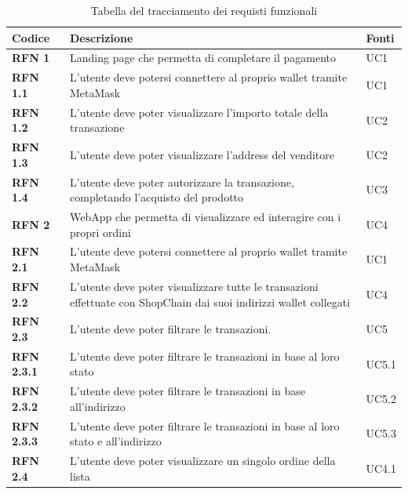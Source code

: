 \begin{longtable}[c]{|l|p{9cm}|l|}
\caption{Tabella del tracciamento dei requisti funzionali}
\label{tab:requisiti-funzionali}
\hline
\rowcolor{gray!40}
\textbf{Codice} &
\textbf{Descrizione} &
\textbf{Fonti} \\ \hline
\endhead

\textbf{RFN 1} & Landing page che permetta di completare il pagamento & UC1 \\ \hline

\textbf{RFN 1.1} & L’utente deve potersi connettere al proprio wallet tramite MetaMask & UC1 \\ \hline

\textbf{RFN 1.2} & L’utente deve poter visualizzare l’importo totale della transazione & UC2 \\ \hline

\textbf{RFN 1.3} & L’utente deve poter visualizzare l’address del venditore & UC2 \\ \hline

\textbf{RFN 1.4} & L’utente deve poter autorizzare la transazione, completando l’acquisto del prodotto & UC3 \\ \hline

\textbf{RFN 2} & WebApp che permetta di visualizzare ed interagire con i propri ordini & UC4 \\ \hline

\textbf{RFN 2.1} & L’utente deve potersi connettere al proprio wallet tramite MetaMask & UC1 \\ \hline

\textbf{RFN 2.2} & L’utente deve poter visualizzare tutte le transazioni effettuate con ShopChain dai suoi indirizzi wallet collegati & UC4 \\ \hline

\textbf{RFN 2.3} & L’utente deve poter filtrare le transazioni. & UC5 \\ \hline

\textbf{RFN 2.3.1} & L’utente deve poter filtrare le transazioni in base al loro stato & UC5.1 \\ \hline

\textbf{RFN 2.3.2} & L’utente deve poter filtrare le transazioni in base all’indirizzo & UC5.2 \\ \hline

\textbf{RFN 2.3.3} & L’utente deve poter filtrare le transazioni in base al loro stato e all'indirizzo & UC5.3 \\ \hline

\textbf{RFN 2.4} & L’utente deve poter visualizzare un singolo ordine della lista & UC4.1 \\ \hline


\end{longtable}
